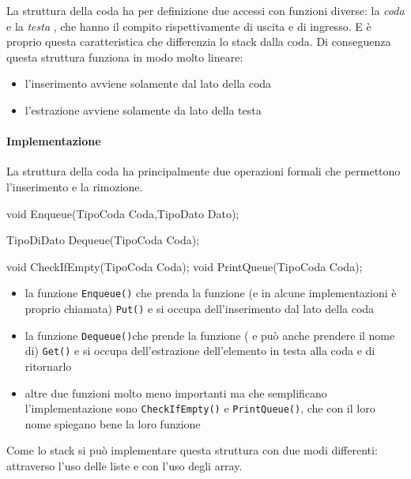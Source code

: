 \documentclass[
]{article}
\newenvironment{Shaded}{}{}
\newcommand{\DataTypeTok}[1]{\textcolor[rgb]{0.56,0.13,0.00}{#1}}
\newcommand{\NormalTok}[1]{#1}
\begin{document}
La struttura della coda ha per definizione due accessi con funzioni
diverse: la \emph{coda} e la \emph{testa} , che hanno il compito
rispettivamente di uscita e di ingresso. E è proprio questa
caratteristica che differenzia lo stack dalla coda. Di conseguenza
questa struttura funziona in modo molto lineare:

\begin{itemize}
\item
  l'inserimento avviene solamente dal lato della coda
\item
  l'estrazione avviene solamente da lato della testa
\end{itemize}

\hypertarget{header-n1421}{%
\paragraph{Implementazione}\label{header-n1421}}

La struttura della coda ha principalmente due operazioni formali che
permettono l'inserimento e la rimozione.

\begin{Shaded}
\begin{Highlighting}[]
\DataTypeTok{void}\NormalTok{ Enqueue(TipoCoda Coda,TipoDato Dato); }

\NormalTok{TipoDiDato Dequeue(TipoCoda Coda);}

\DataTypeTok{void}\NormalTok{ CheckIfEmpty(TipoCoda Coda);}
\DataTypeTok{void}\NormalTok{ PrintQueue(TipoCoda Coda);}
\end{Highlighting}
\end{Shaded}

\begin{itemize}
\item
  la funzione \texttt{Enqueue()} che prenda la funzione (e in alcune
  implementazioni è proprio chiamata) \texttt{Put()} e si occupa
  dell'inserimento dal lato della coda
\item
  la funzione \texttt{Dequeue()}che prende la funzione ( e può anche
  prendere il nome di) \texttt{Get()} e si occupa dell'estrazione
  dell'elemento in testa alla coda e di ritornarlo
\item
  altre due funzioni molto meno importanti ma che semplificano
  l'implementazione sono \texttt{CheckIfEmpty()} e
  \texttt{PrintQueue()}, che con il loro nome spiegano bene la loro
  funzione
\end{itemize}

Come lo stack si può implementare questa struttura con due modi
differenti: attraverso l'uso delle liste e con l'uso degli array.
\end{document}
